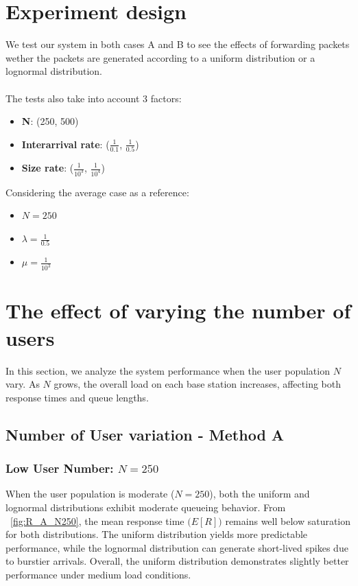 \documentclass{report}
\begin{document}
\section{Experiment design}
We test our system in both cases A and B to see the effects of forwarding packets wether the packets are generated according to a uniform distribution or a lognormal distribution.\\\\
The tests also take into account 3 factors:
\begin{itemize}
    \item \textbf{N}: (250, 500)
    \item \textbf{Interarrival rate}: ($\frac{1}{0.1}$, $\frac{1}{0.5}$)
    \item \textbf{Size rate}: ($\frac{1}{10^3}$, $\frac{1}{10^4}$)
\end{itemize}

Considering the average case as a reference:
\begin{itemize}
    \item $N=250$
    \item $\lambda=\frac{1}{0.5}$
    \item $\mu=\frac{1}{10^3}$
\end{itemize}

\section{The effect of varying the number of users}

In this section, we analyze the system performance when the user population \(N\) vary. As \(N\) grows, the overall load on each base station increases, affecting both response times and queue lengths. 

\subsection*{Number of User variation - Method A}

\subsubsection{\textbf{Low User Number: \(N = 250\)}}

When the user population is moderate (\(N = 250\)), both the uniform and lognormal distributions exhibit moderate queueing behavior. From \figurename~\ref{fig:R_A_N250}, the mean response time \(\bigl(E[R]\bigr)\) remains well below saturation for both distributions. The uniform distribution yields more predictable performance, while the lognormal distribution can generate short-lived spikes due to burstier arrivals. Overall, the uniform distribution demonstrates slightly better performance under medium load conditions.
\end{document}
